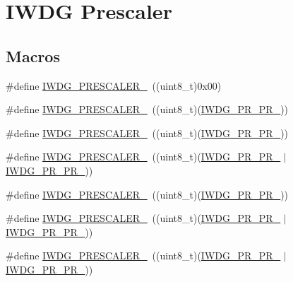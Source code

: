 \hypertarget{group___i_w_d_g___prescaler}{}\section{I\+W\+DG Prescaler}
\label{group___i_w_d_g___prescaler}
\subsection*{Macros}
\begin{DoxyCompactItemize}
\item 
\#define \hyperlink{group___i_w_d_g___prescaler_ga470bb195d35ef7a0b75164c228b4ee69}{I\+W\+D\+G\+\_\+\+P\+R\+E\+S\+C\+A\+L\+E\+R\+\_}~((uint8\+\_\+t)0x00)
\item 
\#define \hyperlink{group___i_w_d_g___prescaler_ga5f00866f823ee700005e8a753b28ad75}{I\+W\+D\+G\+\_\+\+P\+R\+E\+S\+C\+A\+L\+E\+R\+\_}~((uint8\+\_\+t)(\hyperlink{group___peripheral___registers___bits___definition_ga9b727e7882603df1684cbf230520ca76}{I\+W\+D\+G\+\_\+\+P\+R\+\_\+\+P\+R\+\_}))
\item 
\#define \hyperlink{group___i_w_d_g___prescaler_gab3eb3c6a10facc8b0dc7c33608f6e129}{I\+W\+D\+G\+\_\+\+P\+R\+E\+S\+C\+A\+L\+E\+R\+\_}~((uint8\+\_\+t)(\hyperlink{group___peripheral___registers___bits___definition_gafba2551b90c68d95c736a116224b473e}{I\+W\+D\+G\+\_\+\+P\+R\+\_\+\+P\+R\+\_}))
\item 
\#define \hyperlink{group___i_w_d_g___prescaler_gac3f33494fb7aaa2845ac106858394e03}{I\+W\+D\+G\+\_\+\+P\+R\+E\+S\+C\+A\+L\+E\+R\+\_}~((uint8\+\_\+t)(\hyperlink{group___peripheral___registers___bits___definition_gafba2551b90c68d95c736a116224b473e}{I\+W\+D\+G\+\_\+\+P\+R\+\_\+\+P\+R\+\_} $\vert$ \hyperlink{group___peripheral___registers___bits___definition_ga9b727e7882603df1684cbf230520ca76}{I\+W\+D\+G\+\_\+\+P\+R\+\_\+\+P\+R\+\_}))
\item 
\#define \hyperlink{group___i_w_d_g___prescaler_ga52a956c645ce59312c84cbe37b2b20e4}{I\+W\+D\+G\+\_\+\+P\+R\+E\+S\+C\+A\+L\+E\+R\+\_}~((uint8\+\_\+t)(\hyperlink{group___peripheral___registers___bits___definition_ga55a1d7fde4e3e724a8644652ba9bb2b9}{I\+W\+D\+G\+\_\+\+P\+R\+\_\+\+P\+R\+\_}))
\item 
\#define \hyperlink{group___i_w_d_g___prescaler_ga17901d4e3e52af620acbbb146fd79264}{I\+W\+D\+G\+\_\+\+P\+R\+E\+S\+C\+A\+L\+E\+R\+\_}~((uint8\+\_\+t)(\hyperlink{group___peripheral___registers___bits___definition_ga55a1d7fde4e3e724a8644652ba9bb2b9}{I\+W\+D\+G\+\_\+\+P\+R\+\_\+\+P\+R\+\_} $\vert$ \hyperlink{group___peripheral___registers___bits___definition_ga9b727e7882603df1684cbf230520ca76}{I\+W\+D\+G\+\_\+\+P\+R\+\_\+\+P\+R\+\_}))
\item 
\#define \hyperlink{group___i_w_d_g___prescaler_ga885221d5bb09157c9e953a1be38556f0}{I\+W\+D\+G\+\_\+\+P\+R\+E\+S\+C\+A\+L\+E\+R\+\_}~((uint8\+\_\+t)(\hyperlink{group___peripheral___registers___bits___definition_ga55a1d7fde4e3e724a8644652ba9bb2b9}{I\+W\+D\+G\+\_\+\+P\+R\+\_\+\+P\+R\+\_} $\vert$ \hyperlink{group___peripheral___registers___bits___definition_gafba2551b90c68d95c736a116224b473e}{I\+W\+D\+G\+\_\+\+P\+R\+\_\+\+P\+R\+\_}))
\end{DoxyCompactItemize}


